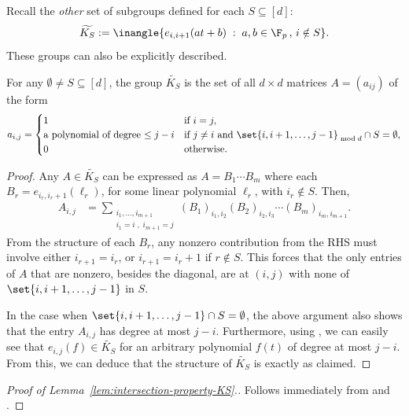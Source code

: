 \documentclass{toc}
\begin{document}
\noindent
Recall the \emph{other} set of subgroups defined for each $S \subseteq [d]$:
\[
  \widetilde{K_S} := \inangle{e_{i,i+1}(at+b)\;:\; a,b\in \F_p\,,\, i\notin S}.
\]
These groups can also be explicitly described.

\begin{lemma}\label{lem:exp-desc-K_S-tilde} For any $\emptyset \neq S \subseteq [d]$, the group  $\widetilde{K_S}$ is the set of all $d\times d$ matrices $A = (a_{ij})$ of the form
  \[
    a_{i,j} = \begin{cases}
      1 & \text{if }i = j,\\
      \text{a polynomial of degree $\leq j-i$} & \text{if }j\neq i \text{ and }\set{i,i+1,\ldots,j-1}_{\bmod{d}} \cap S = \emptyset,\\
      0 & \text{otherwise}.
    \end{cases}
  \]
\end{lemma}
\begin{proof}
Any $A\in \widetilde{K_S}$ can be expressed as  $A = B_1\cdots B_m$ where each $B_r = e_{i_{r},i_{r}+1}(\ell_r)$, for some linear polynomial $\ell_r$, with $i_r \notin S$.
Then,
\begin{align*}
  A_{i,j} & = \sum_{\substack{i_1,\ldots, i_{m+1}\\i_1 = i\;,\;i_{m+1} = j}} (B_1)_{i_1,i_2} (B_2)_{i_2,i_3} \cdots (B_m)_{i_m,i_{m+1}}. 
\end{align*}
From the structure of each $B_r$, any nonzero contribution from the RHS must involve either $i_{r+1} = i_{r}$, or $i_{r+1} = i_r + 1$ if $r \notin S$. This forces that the only entries of $A$ that are nonzero, besides the diagonal, are at $(i,j)$ with none of $\set{i,i+1,\ldots, j-1}$ in $S$.

In the case when $\set{i,i+1,\ldots, j-1} \cap S = \emptyset$, the above
argument also shows that the entry $A_{i,j}$ has degree at most $j-i$. Furthermore, using
, we can easily see that $e_{i,j}(f) \in \widetilde{K_S}$ for an arbitrary polynomial $f(t)$ of degree at most $j-i$. From this, we can deduce that the structure of $\widetilde{K_S}$ is exactly as claimed. 
\end{proof}

\begin{proof}[Proof of Lemma~\ref{lem:intersection-property-KS}.]
Follows immediately from  and . 
\end{proof}
\end{document}

